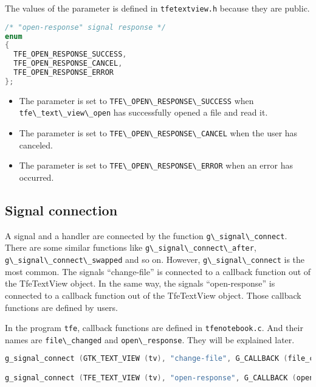 The values of the parameter is defined in
\passthrough{\lstinline!tfetextview.h!} because they are public.

\begin{lstlisting}[language=C]
/* "open-response" signal response */
enum
{
  TFE_OPEN_RESPONSE_SUCCESS,
  TFE_OPEN_RESPONSE_CANCEL,
  TFE_OPEN_RESPONSE_ERROR
};
\end{lstlisting}

\begin{itemize}
\tightlist
\item
  The parameter is set to
  \passthrough{\lstinline!TFE\_OPEN\_RESPONSE\_SUCCESS!} when
  \passthrough{\lstinline!tfe\_text\_view\_open!} has successfully
  opened a file and read it.
\item
  The parameter is set to
  \passthrough{\lstinline!TFE\_OPEN\_RESPONSE\_CANCEL!} when the user
  has canceled.
\item
  The parameter is set to
  \passthrough{\lstinline!TFE\_OPEN\_RESPONSE\_ERROR!} when an error has
  occurred.
\end{itemize}

\hypertarget{signal-connection}{%
\subsection{Signal connection}\label{signal-connection}}

A signal and a handler are connected by the function
\passthrough{\lstinline!g\_signal\_connect!}. There are some similar
functions like \passthrough{\lstinline!g\_signal\_connect\_after!},
\passthrough{\lstinline!g\_signal\_connect\_swapped!} and so on.
However, \passthrough{\lstinline!g\_signal\_connect!} is the most
common. The signals ``change-file'' is connected to a callback function
out of the TfeTextView object. In the same way, the signals
``open-response'' is connected to a callback function out of the
TfeTextView object. Those callback functions are defined by users.

In the program \passthrough{\lstinline!tfe!}, callback functions are
defined in \passthrough{\lstinline!tfenotebook.c!}. And their names are
\passthrough{\lstinline!file\_changed!} and
\passthrough{\lstinline!open\_response!}. They will be explained later.

\begin{lstlisting}[language=C]
g_signal_connect (GTK_TEXT_VIEW (tv), "change-file", G_CALLBACK (file_changed), nb);

g_signal_connect (TFE_TEXT_VIEW (tv), "open-response", G_CALLBACK (open_response), nb);
\end{lstlisting}

